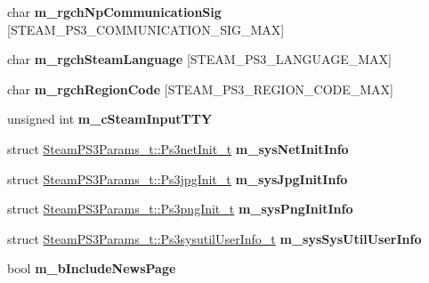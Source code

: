 \begin{DoxyCompactItemize}
\item 
\mbox{\label{struct_steam_p_s3_params__t_a6e5fb1aaa0ba2b365fd6a47453267040}} 
char {\bfseries m\+\_\+rgch\+Np\+Communication\+Sig} \mbox{[}S\+T\+E\+A\+M\+\_\+\+P\+S3\+\_\+\+C\+O\+M\+M\+U\+N\+I\+C\+A\+T\+I\+O\+N\+\_\+\+S\+I\+G\+\_\+\+M\+AX\mbox{]}
\item 
\mbox{\label{struct_steam_p_s3_params__t_a5d0dd7a904368e11406e2d4d0bcecb9f}} 
char {\bfseries m\+\_\+rgch\+Steam\+Language} \mbox{[}S\+T\+E\+A\+M\+\_\+\+P\+S3\+\_\+\+L\+A\+N\+G\+U\+A\+G\+E\+\_\+\+M\+AX\mbox{]}
\item 
\mbox{\label{struct_steam_p_s3_params__t_aa510260c607406ab1c5b216be60789ac}} 
char {\bfseries m\+\_\+rgch\+Region\+Code} \mbox{[}S\+T\+E\+A\+M\+\_\+\+P\+S3\+\_\+\+R\+E\+G\+I\+O\+N\+\_\+\+C\+O\+D\+E\+\_\+\+M\+AX\mbox{]}
\item 
\mbox{\label{struct_steam_p_s3_params__t_a5a463e30045adee46df0696ed27ad38b}} 
unsigned int {\bfseries m\+\_\+c\+Steam\+Input\+T\+TY}
\item 
\mbox{\label{struct_steam_p_s3_params__t_a0021f66e51fc9c1bd9c48c69a495916b}} 
struct \hyperlink{struct_steam_p_s3_params__t_1_1_ps3net_init__t}{Steam\+P\+S3\+Params\+\_\+t\+::\+Ps3net\+Init\+\_\+t} {\bfseries m\+\_\+sys\+Net\+Init\+Info}
\item 
\mbox{\label{struct_steam_p_s3_params__t_ad4930862d9d02a672918cbe22fa4392d}} 
struct \hyperlink{struct_steam_p_s3_params__t_1_1_ps3jpg_init__t}{Steam\+P\+S3\+Params\+\_\+t\+::\+Ps3jpg\+Init\+\_\+t} {\bfseries m\+\_\+sys\+Jpg\+Init\+Info}
\item 
\mbox{\label{struct_steam_p_s3_params__t_af612e156f375450f28319eaaeaff13db}} 
struct \hyperlink{struct_steam_p_s3_params__t_1_1_ps3png_init__t}{Steam\+P\+S3\+Params\+\_\+t\+::\+Ps3png\+Init\+\_\+t} {\bfseries m\+\_\+sys\+Png\+Init\+Info}
\item 
\mbox{\label{struct_steam_p_s3_params__t_ae94f98ef9365fa79e8c2497765e3af95}} 
struct \hyperlink{struct_steam_p_s3_params__t_1_1_ps3sysutil_user_info__t}{Steam\+P\+S3\+Params\+\_\+t\+::\+Ps3sysutil\+User\+Info\+\_\+t} {\bfseries m\+\_\+sys\+Sys\+Util\+User\+Info}
\item 
\mbox{\label{struct_steam_p_s3_params__t_a90d5216379054b840a7c1c75381e7a9b}} 
bool {\bfseries m\+\_\+b\+Include\+News\+Page}
\end{DoxyCompactItemize}



